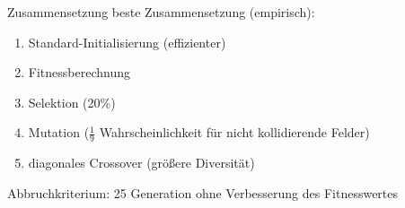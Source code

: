 \begin{frame}{Zusammensetzung}
    beste Zusammensetzung (empirisch):
    \begin{enumerate}
        \item Standard-Initialisierung (effizienter)
        \item Fitnessberechnung
        \item Selektion (20\%)
        \item Mutation (\(\frac{1}{9}\) \- Wahrscheinlichkeit für nicht kollidierende Felder)
        \item diagonales Crossover (größere Diversität)
    \end{enumerate}
    Abbruchkriterium: 25 Generation ohne Verbesserung des Fitnesswertes
\end{frame}